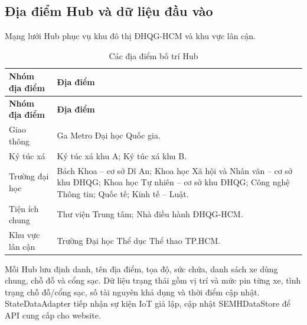 \subsection{Địa điểm Hub và dữ liệu đầu vào}
Mạng lưới Hub phục vụ khu đô thị ĐHQG-HCM và khu vực lân cận.
\begin{longtable}{|L{32mm}|L{107mm}|}
\caption{Các địa điểm bố trí Hub}\\\hline
\textbf{Nhóm địa điểm} & \textbf{Địa điểm}\\\hline
\endfirsthead
\hline\textbf{Nhóm địa điểm} & \textbf{Địa điểm}\\\hline\endhead
Giao thông & Ga Metro Đại học Quốc gia.\\\hline
Ký túc xá & Ký túc xá khu A; Ký túc xá khu B.\\\hline
Trường đại học & Bách Khoa -- cơ sở Dĩ An; Khoa học Xã hội và Nhân văn -- cơ sở khu ĐHQG; Khoa học Tự nhiên -- cơ sở khu ĐHQG; Công nghệ Thông tin; Quốc tế; Kinh tế -- Luật.\\\hline
Tiện ích chung & Thư viện Trung tâm; Nhà điều hành ĐHQG-HCM.\\\hline
Khu vực lân cận & Trường Đại học Thể dục Thể thao TP.HCM.\\\hline
\end{longtable}

Mỗi Hub lưu định danh, tên địa điểm, tọa độ, sức chứa, danh sách xe dùng chung, chỗ đỗ và cổng sạc. Dữ liệu trạng thái gồm vị trí và mức pin từng xe, tình trạng chỗ đỗ/cổng sạc, số tài nguyên khả dụng và thời điểm cập nhật. StateDataAdapter tiếp nhận sự kiện IoT giả lập, cập nhật SEMHDataStore để API cung cấp cho website.

